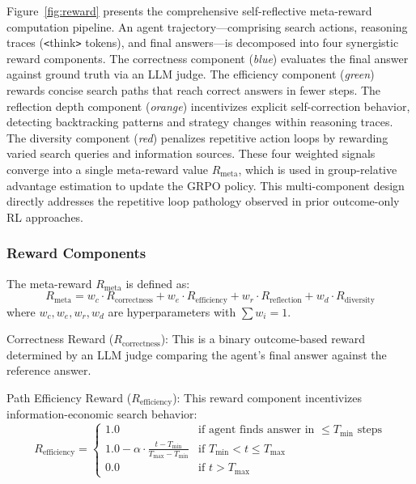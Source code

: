 \documentclass[notspecified,article,accept,pdftex,moreauthors]{Definitions/mdpi}
\renewcommand{\textbf}[1]{#1}
\begin{document}
Figure~\ref{fig:reward} presents the comprehensive self-reflective meta-reward computation pipeline. An agent trajectory---comprising search actions, reasoning traces (\texttt{<}think\texttt{>} tokens), and final answers---is decomposed into four synergistic reward components. The \textbf{correctness} component (\textit{blue}) evaluates the final answer against ground truth via an LLM judge. The \textbf{efficiency} component (\textit{green}) rewards concise search paths that reach correct answers in fewer steps. The \textbf{reflection depth} component (\textit{orange}) incentivizes explicit self-correction behavior, detecting backtracking patterns and strategy changes within reasoning traces. The \textbf{diversity} component (\textit{red}) penalizes repetitive action loops by rewarding varied search queries and information sources. These four weighted signals converge into a single meta-reward value $R_{\text{meta}}$, which is used in group-relative advantage estimation to update the GRPO policy. This multi-component design directly addresses the repetitive loop pathology observed in prior outcome-only RL approaches.

\subsubsection{Reward Components}
The meta-reward $R_{\text{meta}}$ is defined as:
\begin{equation}
R_{\text{meta}} = w_c \cdot R_{\text{correctness}} + w_e \cdot R_{\text{efficiency}} + w_r \cdot R_{\text{reflection}} + w_d \cdot R_{\text{diversity}}
\label{eq:meta-reward}
\end{equation}
where $w_c, w_e, w_r, w_d$ are hyperparameters with $\sum w_i = 1$.

\textbf{Correctness Reward ($R_{\text{correctness}}$):} This is a binary outcome-based reward determined by an LLM judge comparing the agent's final answer against the reference answer.

\textbf{Path Efficiency Reward ($R_{\text{efficiency}}$):} This reward component incentivizes information-economic search behavior:
\begin{equation}
R_{\text{efficiency}} = \begin{cases}
1.0 & \text{if agent finds answer in $\leq T_{\text{min}}$ steps} \\
1.0 - \alpha \cdot \frac{t - T_{\text{min}}}{T_{\text{max}} - T_{\text{min}}} & \text{if $T_{\text{min}} < t \leq T_{\text{max}}$} \\
0.0 & \text{if $t > T_{\text{max}}$}
\end{cases}
\label{eq:efficiency-reward}
\end{equation}
\end{document}

